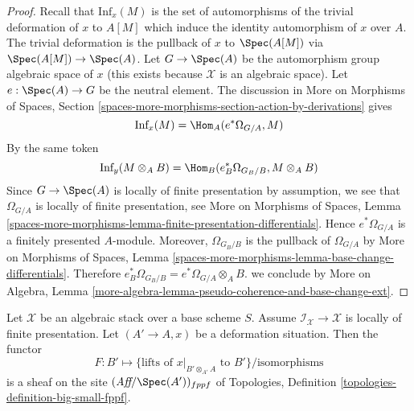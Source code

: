 \begin{proof}
Recall that $\text{Inf}_x(M)$ is the set of automorphisms of the
trivial deformation of $x$ to $A[M]$ which induce the identity
automorphism of $x$ over $A$. The trivial deformation is
the pullback of $x$ to $\Spec(A[M])$ via $\Spec(A[M]) \to \Spec(A)$.
Let $G \to \Spec(A)$ be the automorphism group algebraic space of $x$
(this exists because $\mathcal{X}$ is an algebraic space).
Let $e : \Spec(A) \to G$ be the neutral element.
The discussion in More on Morphisms of Spaces, Section
\ref{spaces-more-morphisms-section-action-by-derivations}
gives
$$
\text{Inf}_x(M) = \Hom_A(e^*\Omega_{G/A}, M)
$$
By the same token
$$
\text{Inf}_y(M \otimes_A B) = \Hom_B(e_B^*\Omega_{G_B/B}, M \otimes_A B)
$$
Since $G \to \Spec(A)$ is locally of finite presentation by
assumption, we see that $\Omega_{G/A}$ is locally of finite
presentation, see
More on Morphisms of Spaces, Lemma
\ref{spaces-more-morphisms-lemma-finite-presentation-differentials}.
Hence $e^*\Omega_{G/A}$ is a finitely presented $A$-module.
Moreover, $\Omega_{G_B/B}$ is the pullback of $\Omega_{G/A}$ by
More on Morphisms of Spaces, Lemma
\ref{spaces-more-morphisms-lemma-base-change-differentials}.
Therefore $e_B^*\Omega_{G_B/B} = e^*\Omega_{G/A} \otimes_A B$.
we conclude by More on Algebra, Lemma
\ref{more-algebra-lemma-pseudo-coherence-and-base-change-ext}.
\end{proof}

\begin{lemma}
\label{lemma-sheaf-of-infinitesimal-lifts}
Let $\mathcal{X}$ be an algebraic stack over a base scheme $S$.
Assume $\mathcal{I}_\mathcal{X} \to \mathcal{X}$ is locally
of finite presentation. Let $(A' \to A, x)$ be a deformation situation.
Then the functor
$$
F : B' \longmapsto
\{\text{lifts of }x|_{B' \otimes_{A'} A}\text{ to } B'\}/\text{isomorphisms}
$$
is a sheaf on the site $(\textit{Aff}/\Spec(A'))_{fppf}$ of
Topologies, Definition \ref{topologies-definition-big-small-fppf}.
\end{lemma}

